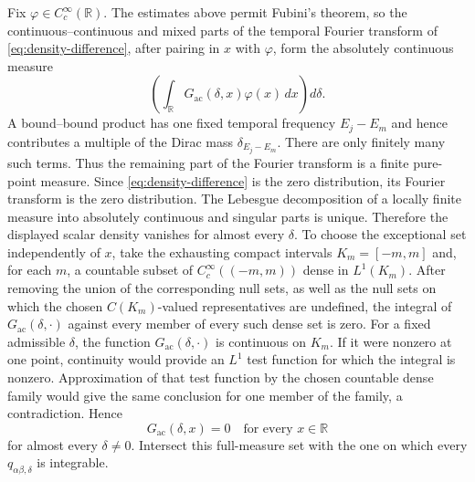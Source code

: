 \documentclass[11pt]{amsart}
\numberwithin{equation}{section}
\theoremstyle{remark}
\newcommand{\R}{\mathbb R}
\newcommand{\ac}{\mathrm{ac}}
\begin{document}
Fix $\varphi\in C_c^\infty(\R)$.  The estimates above permit Fubini's theorem,
so the continuous--continuous and mixed parts of the temporal Fourier
transform of \eqref{eq:density-difference}, after pairing in $x$ with
$\varphi$, form the absolutely continuous measure
\[
 \left(\int_\R G_{\ac}(\delta,x)\varphi(x)\,dx\right)d\delta.
\]
A bound--bound product has one fixed temporal frequency
$E_j-E_m$ and hence contributes a multiple of the Dirac mass
$\delta_{E_j-E_m}$.  There are only finitely many such terms.  Thus the
remaining part of the Fourier transform is a finite pure-point measure.
Since \eqref{eq:density-difference} is the zero distribution, its Fourier
transform is the zero distribution.  The Lebesgue decomposition of a locally
finite measure into absolutely continuous and singular parts is unique.
Therefore the displayed scalar density vanishes for almost every $\delta$.  To choose the exceptional set independently of $x$, take the
exhausting compact intervals $K_m=[-m,m]$ and, for each $m$, a countable subset
of $C_c^\infty((-m,m))$ dense in $L^1(K_m)$.  After removing the union of the
corresponding null sets, as well as the null sets on which the chosen
$C(K_m)$-valued representatives are undefined, the integral of
$G_{\ac}(\delta,\cdot)$ against every member of every such dense set is zero.
For a fixed admissible $\delta$, the function
$G_{\ac}(\delta,\cdot)$ is continuous on $K_m$.  If it were nonzero at one
point, continuity would provide an $L^1$ test function for which the integral
is nonzero.  Approximation of that test function by the chosen countable dense
family would give the same conclusion for one member of the family, a
contradiction.  Hence
\begin{equation}
 G_{\ac}(\delta,x)=0
 \quad\text{for every }x\in\R
 \label{eq:fixed-gap-common-null-set}
\end{equation}
for almost every $\delta\ne0$.  Intersect this full-measure set with the one
on which every $q_{\alpha\beta,\delta}$ is integrable.
\end{document}
